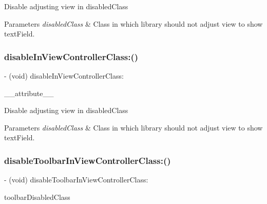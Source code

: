 Disable adjusting view in disabled\+Class


\begin{DoxyParams}{Parameters}
{\em disabled\+Class} & Class in which library should not adjust view to show text\+Field. \\
\hline
\end{DoxyParams}
\mbox{\label{interface_i_q_keyboard_manager_a95cec0b3acf0d474e40883408b1c7785}} 
\subsubsection{\texorpdfstring{disable\+In\+View\+Controller\+Class\+:()}{disableInViewControllerClass:()}\hspace{0.1cm}{\footnotesize\ttfamily [3/3]}}
{\footnotesize\ttfamily -\/ (void) disable\+In\+View\+Controller\+Class\+: \begin{DoxyParamCaption}\item[{((deprecated(\char`\"{}This method is replaced with disable\+Distance\+Handling\+In\+View\+Controller\+Class\+: method to adopt more graceful method name. Some developers confuses with this method name. This method will be removed in upcoming release.\char`\"{})))}]{\+\_\+\+\_\+attribute\+\_\+\+\_\+ }\end{DoxyParamCaption}}

Disable adjusting view in disabled\+Class


\begin{DoxyParams}{Parameters}
{\em disabled\+Class} & Class in which library should not adjust view to show text\+Field. \\
\hline
\end{DoxyParams}
\mbox{\label{interface_i_q_keyboard_manager_ab613a813f64570cb4c10e03887356692}} 
\subsubsection{\texorpdfstring{disable\+Toolbar\+In\+View\+Controller\+Class\+:()}{disableToolbarInViewControllerClass:()}\hspace{0.1cm}{\footnotesize\ttfamily [1/3]}}
{\footnotesize\ttfamily -\/ (void) disable\+Toolbar\+In\+View\+Controller\+Class\+: \begin{DoxyParamCaption}\item[{(nonnull Class)}]{toolbar\+Disabled\+Class }\end{DoxyParamCaption}}

